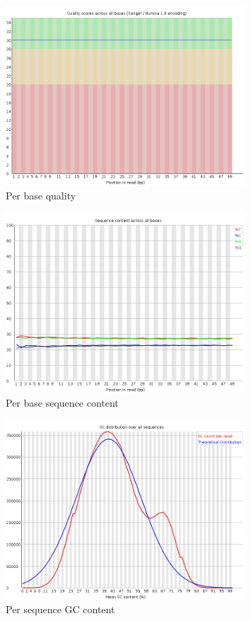 \documentclass[UTF8]{ctexart}
\begin{document}
\begin{figure}[!htb]
	\centering
	\includegraphics[width=0.8\textwidth]{img/SRR14325859_FastQC_Origin_img/per_base_quality.png}	
	\caption{Per base quality\protect}    
\end{figure}

\begin{figure}[!htb]
	\centering
	\includegraphics[width=0.8\textwidth]{img/SRR14325859_FastQC_Origin_img/per_base_sequence_content.png}	
	\caption{Per base sequence content\protect}    
\end{figure}

\begin{figure}[!htb]
	\centering
	\includegraphics[width=0.8\textwidth]{img/SRR14325859_FastQC_Origin_img/per_sequence_gc_content.png}	
	\caption{Per sequence GC content\protect}    
\end{figure}
\end{document}
